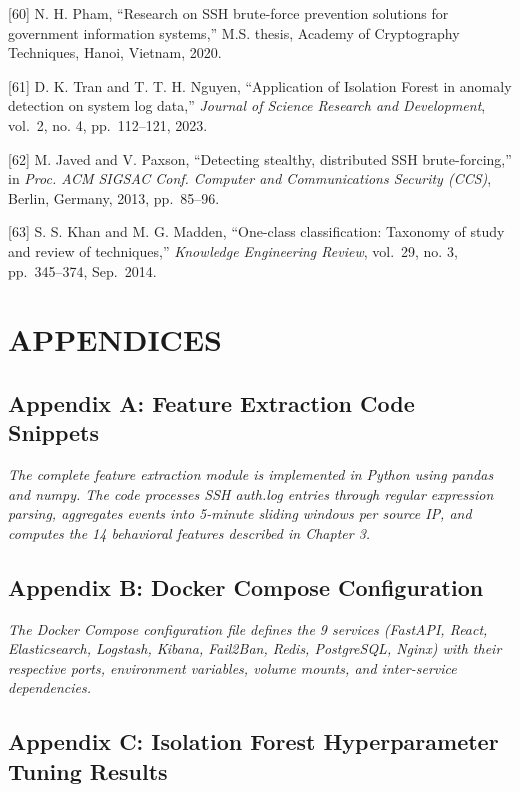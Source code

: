 \documentclass[
  a4paper]{report}
\begin{document}
{[}60{]} N. H. Pham, ``Research on SSH brute-force prevention solutions
for government information systems,'' M.S. thesis, Academy of
Cryptography Techniques, Hanoi, Vietnam, 2020.

{[}61{]} D. K. Tran and T. T. H. Nguyen, ``Application of Isolation
Forest in anomaly detection on system log data,'' \emph{Journal of
Science Research and Development}, vol.~2, no. 4, pp.~112--121, 2023.

{[}62{]} M. Javed and V. Paxson, ``Detecting stealthy, distributed SSH
brute-forcing,'' in \emph{Proc. ACM SIGSAC Conf. Computer and
Communications Security (CCS)}, Berlin, Germany, 2013, pp.~85--96.

{[}63{]} S. S. Khan and M. G. Madden, ``One-class classification:
Taxonomy of study and review of techniques,'' \emph{Knowledge
Engineering Review}, vol.~29, no. 3, pp.~345--374, Sep.~2014.

\section{APPENDICES}\label{appendices}

\subsection{Appendix A: Feature Extraction Code
Snippets}\label{appendix-a-feature-extraction-code-snippets}

\emph{The complete feature extraction module is implemented in Python
using pandas and numpy. The code processes SSH auth.log entries through
regular expression parsing, aggregates events into 5-minute sliding
windows per source IP, and computes the 14 behavioral features described
in Chapter 3.}

\subsection{Appendix B: Docker Compose
Configuration}\label{appendix-b-docker-compose-configuration}

\emph{The Docker Compose configuration file defines the 9 services
(FastAPI, React, Elasticsearch, Logstash, Kibana, Fail2Ban, Redis,
PostgreSQL, Nginx) with their respective ports, environment variables,
volume mounts, and inter-service dependencies.}

\subsection{Appendix C: Isolation Forest Hyperparameter Tuning
Results}\label{appendix-c-isolation-forest-hyperparameter-tuning-results}
\end{document}
